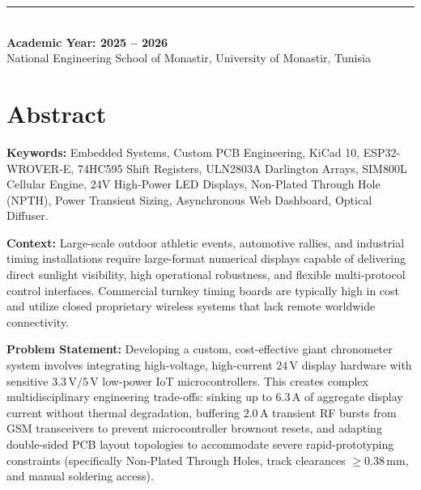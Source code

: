 \documentclass[12pt,a4paper,oneside]{report}
\begin{document}
\begin{titlepage}
\begin{center}
        \vfill
        \rule{\linewidth}{0.6pt}\\[0.2cm]
        {\textbf{Academic Year: 2025 -- 2026}}\\
        {\small National Engineering School of Monastir, University of Monastir, Tunisia}
    \end{center}
\end{titlepage}

\setcounter{page}{2}

\chapter*{Abstract}
\sloppy


\noindent\textbf{Keywords:} Embedded Systems, Custom PCB Engineering, KiCad 10, ESP32-WROVER-E, 74HC595 Shift Registers, ULN2803A Darlington Arrays, SIM800L Cellular Engine, 24V High-Power LED Displays, Non-Plated Through Hole (NPTH), Power Transient Sizing, Asynchronous Web Dashboard, Optical Diffuser.


\vspace{0.5cm}
\noindent\textbf{Context:} Large-scale outdoor athletic events, automotive rallies, and industrial timing installations require large-format numerical displays capable of delivering direct sunlight visibility, high operational robustness, and flexible multi-protocol control interfaces. Commercial turnkey timing boards are typically high in cost and utilize closed proprietary wireless systems that lack remote worldwide connectivity.

\vspace{0.4cm}
\noindent\textbf{Problem Statement:} Developing a custom, cost-effective giant chronometer system involves integrating high-voltage, high-current $24\,\text{V}$ display hardware with sensitive $3.3\,\text{V}/5\,\text{V}$ low-power IoT microcontrollers. This creates complex multidisciplinary engineering trade-offs: sinking up to $6.3\,\text{A}$ of aggregate display current without thermal degradation, buffering $2.0\,\text{A}$ transient RF bursts from GSM transceivers to prevent microcontroller brownout resets, and adapting double-sided PCB layout topologies to accommodate severe rapid-prototyping constraints (specifically Non-Plated Through Holes, track clearances $\ge 0.38\,\text{mm}$, and manual soldering access).
\end{document}
